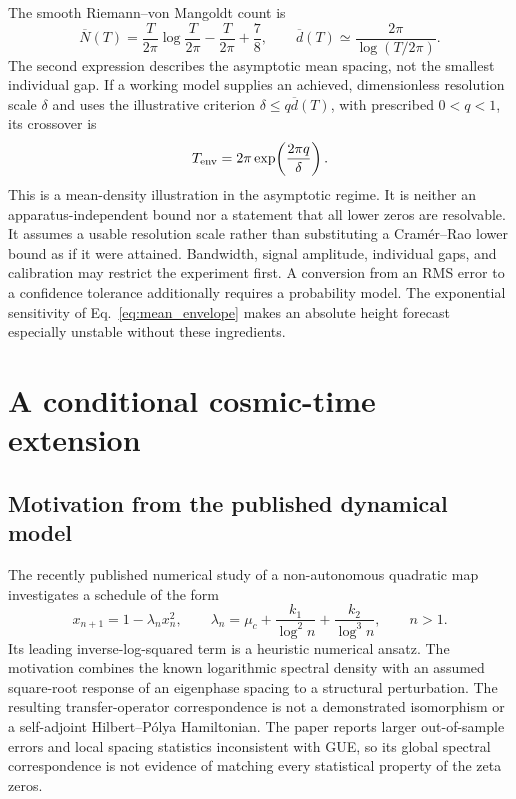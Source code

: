 The smooth Riemann--von Mangoldt count is
\begin{equation}
 \overline N(T)=\frac{T}{2\pi}\log\frac{T}{2\pi}
 -\frac{T}{2\pi}+\frac78,
 \qquad
 \overline d(T)\simeq\frac{2\pi}{\log(T/2\pi)}.
 \label{eq:mean_spacing}
\end{equation}
The second expression describes the asymptotic mean spacing, not the smallest
individual gap. If a working model supplies an achieved, dimensionless
resolution scale $\delta$ and uses the illustrative criterion
$\delta\leq q\overline d(T)$, with prescribed $0<q<1$, its crossover is
\begin{equation}
 T_{\rm env}=2\pi\exp\!\left(\frac{2\pi q}{\delta}\right).
 \label{eq:mean_envelope}
\end{equation}
This is a mean-density illustration in the asymptotic regime. It is neither
an apparatus-independent bound nor a statement that all lower zeros are
resolvable. It assumes a usable resolution scale rather than substituting a
Cram\'er--Rao lower bound as if it were attained. Bandwidth, signal amplitude,
individual gaps, and calibration may restrict the experiment first. A
conversion from an RMS error to a confidence tolerance additionally requires
a probability model. The exponential sensitivity of
Eq.~\eqref{eq:mean_envelope} makes an absolute height forecast especially
unstable without these ingredients.

\section{A conditional cosmic-time extension}
\label{sec:cosmic_extension}

\subsection{Motivation from the published dynamical model}

The recently published numerical study of a non-autonomous quadratic map
\cite{Wang2026Spectral} investigates a schedule of the form
\begin{equation}
 x_{n+1}=1-\lambda_n x_n^2,
 \qquad
 \lambda_n=\mu_c+\frac{k_1}{\log^2n}
                  +\frac{k_2}{\log^3n},\qquad n>1.
 \label{eq:published_map}
\end{equation}
Its leading inverse-log-squared term is a heuristic numerical ansatz. The
motivation combines the known logarithmic spectral density with an assumed
square-root response of an eigenphase spacing to a structural perturbation.
The resulting transfer-operator correspondence is not a demonstrated
isomorphism or a self-adjoint Hilbert--P\'olya Hamiltonian. The paper reports
larger out-of-sample errors and local spacing statistics inconsistent with
GUE, so its global spectral correspondence is not evidence of matching every
statistical property of the zeta zeros.

